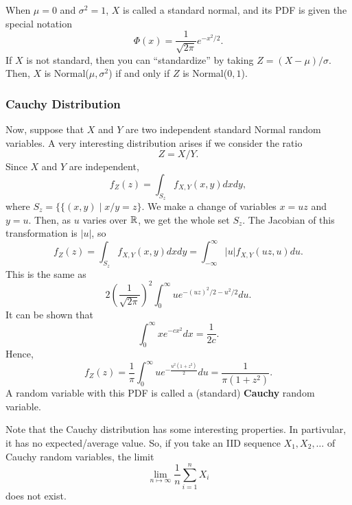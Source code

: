 \documentclass[letterpaper]{article}
\begin{document}
When $\mu = 0$ and $\sigma^2 = 1$, $X$ is called a standard normal, and its PDF is given the special notation 
\[\Phi(x) = \frac{1}{\sqrt{2\pi}} e^{-x^2 / 2}.\]
If $X$ is not standard, then you can ``standardize'' by taking $Z = (X - \mu) / \sigma$. Then, $X$ is Normal($\mu, \sigma^2$) if and only if $Z$ is Normal($0, 1$).

\subsubsection{Cauchy Distribution}
Now, suppose that $X$ and $Y$ are two independent standard Normal random variables. A very interesting distribution arises if we consider the ratio \[Z = X / Y.\] Since $X$ and $Y$ are independent, \[f_{Z}(z) = \int_{S_z} f_{X, Y}(x, y) dx dy,\] where $S_z = \{\{(x, y) \mid x / y = z\}$. We make a change of variables $x = uz$ and $y = u$. Then, as $u$ varies over $\mathbb{R}$, we get the whole set $S_z$. The Jacobian of this transformation is $|u|$, so 
\[f_{Z}(z) = \int_{S_z} f_{X, Y}(x, y) dxdy = \int_{-\infty}^{\infty} |u| f_{X, Y}(uz, u) du.\]
This is the same as 
\[2\left(\frac{1}{\sqrt{2\pi}}\right)^2 \int_{0}^{\infty} ue^{-(uz)^2 / 2 - u^2 / 2} du.\]
It can be shown that 
\[\int_0^{\infty} xe^{-cx^2} dx = \frac{1}{2c}.\]
Hence,
\[f_{Z}(z) = \frac{1}{\pi} \int_0^{\infty} ue^{-\frac{u^2 (1 + z^2)}{2}} du = \frac{1}{\pi (1 + z^2)}.\]
A random variable with this PDF is called a (standard) \textbf{Cauchy} random variable. 

\bigskip 

Note that the Cauchy distribution has some interesting properties. In partivular, it has no expected/average value. So, if you take an IID sequence $X_1, X_2, \dots$ of Cauchy random variables, the limit 
\[\lim_{n \mapsto \infty} \frac{1}{n} \sum_{i = 1}^n X_i\]
does not exist. 
\end{document}
